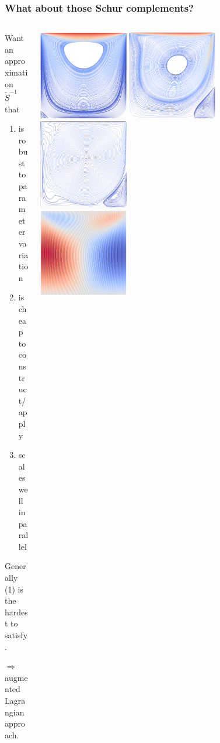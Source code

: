 \documentclass[presentation,aspectratio=43, 10pt]{beamer}
\begin{document}
\begin{frame}
  \frametitle{What about those Schur complements?}
  \begin{columns}
    \begin{column}{0.55\textwidth}
      Want an approximation $\tilde{S}^{-1}$ that
      \begin{enumerate}
      \item is robust to parameter variation
      \item is cheap to construct/apply
      \item scales well in parallel
      \end{enumerate}

      Generally (1) is the hardest to satisfy.

      $\Rightarrow$ augmented Lagrangian approach.
    \end{column}
    \begin{column}{0.45\textwidth}
      \includegraphics[width=0.333\textwidth]{mhd/ldc_1_1_u}%
      \includegraphics[width=0.333\textwidth]{mhd/ldc_500_500_u}%
      \includegraphics[width=0.333\textwidth]{mhd/ldc_5000_5000_u}%
      \\
      \includegraphics[width=0.333\textwidth]{mhd/ldc_1_1_B}%

\end{column}
\end{columns}
\end{frame}
\end{document}
